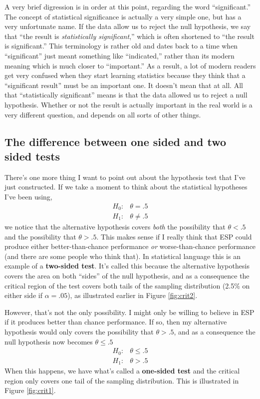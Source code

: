 \documentclass[
]{book}
\begin{document}
A very brief digression is in order at this point, regarding the word ``significant.'' The concept of statistical significance is actually a very simple one, but has a very unfortunate name. If the data allow us to reject the null hypothesis, we say that ``the result is \emph{statistically significant},'' which is often shortened to ``the result is significant.'' This terminology is rather old and dates back to a time when ``significant'' just meant something like ``indicated,'' rather than its modern meaning which is much closer to ``important.'' As a result, a lot of modern readers get very confused when they start learning statistics because they think that a ``significant result'' must be an important one. It doesn't mean that at all. All that ``statistically significant'' means is that the data allowed us to reject a null hypothesis. Whether or not the result is actually important in the real world is a very different question, and depends on all sorts of other things.

\hypertarget{onesidedtests}{%
\subsection{The difference between one sided and two sided tests}\label{onesidedtests}}

There's one more thing I want to point out about the hypothesis test that I've just constructed. If we take a moment to think about the statistical hypotheses I've been using,
\[
\begin{array}{cc}
H_0 : & \theta = .5 \\
H_1 : & \theta \neq .5 
\end{array}
\]
we notice that the alternative hypothesis covers \emph{both} the possibility that \(\theta < .5\) and the possibility that \(\theta > .5\). This makes sense if I really think that ESP could produce either better-than-chance performance \emph{or} worse-than-chance performance (and there are some people who think that). In statistical language this is an example of a {\textbf{two-sided test}}. It's called this because the alternative hypothesis covers the area on both ``sides'' of the null hypothesis, and as a consequence the critical region of the test covers both tails of the sampling distribution (2.5\% on either side if \(\alpha =.05\)), as illustrated earlier in Figure \ref{fig:crit2}.

However, that's not the only possibility. I might only be willing to believe in ESP if it produces better than chance performance. If so, then my alternative hypothesis would only covers the possibility that \(\theta > .5\), and as a consequence the null hypothesis now becomes \(\theta \leq .5\)
\[
\begin{array}{cc}
H_0 : & \theta \leq .5 \\
H_1 : & \theta > .5 
\end{array}
\]
When this happens, we have what's called a {\textbf{one-sided test}} and the critical region only covers one tail of the sampling distribution. This is illustrated in Figure \ref{fig:crit1}.
\end{document}
